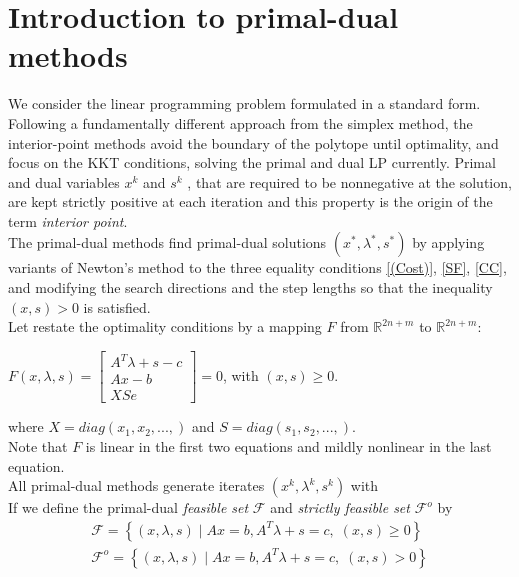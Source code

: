 \documentclass[a4paper,10 pt,titlepage,twoside]{book}
\theoremstyle{plain}
\theoremstyle{definition}
\theoremstyle{remark}
\begin{document}
\newpage
\section{Introduction to primal-dual methods}
We consider the linear programming problem formulated in a standard form. \\
Following a fundamentally different approach from the simplex method, the interior-point methods avoid the boundary of the polytope until optimality, and focus on the KKT conditions, solving the primal and dual LP currently.
Primal and dual variables  $x^{k}$ and $s^{k}$ , that are required to be nonnegative at the solution, are kept strictly positive at each iteration and this property is the origin of the term \textit{interior point}.\\
The primal-dual methods find primal-dual solutions $(x^{*},\lambda^{*},s^{*})$ by applying variants of Newton's method to the three equality conditions \ref{(Cost)}, \ref{SF}, \ref{CC}, and modifying the search directions and the step lengths so that the inequality $(x,s)>0$ is satisfied.\\
 Let restate the optimality conditions by a mapping $\mathit{F}$ from $\mathbb{R}^{2n+m}$ to $\mathbb{R}^{2n+m}$:
\begin{center}\label{F}
	$\mathit{F}(x,\lambda,s)= \begin{bmatrix}
	A^{T}\lambda+s-c \\Ax-b \\XSe
	\end{bmatrix}=0$, with $(x,s)\geq0.$
\end{center}
where $X = diag(x_{1}, x_{2},...,)$ and $S = diag(s_{1}, s_{2},...,)$.\\ Note that $\mathit{F}$ is linear in the first two equations and mildly nonlinear in the last equation. \\ All primal-dual methods generate iterates $(x^{k},\lambda^{k},s^{k})$ with\\
If we define the primal-dual \textit{feasible set} $\mathcal{F}$ and \textit{strictly feasible set} $\mathcal{F}^{o}$ by
\begin{align*}
\mathcal{F} = \left\lbrace(x,\lambda,s)\;|\;Ax = b, A^{T}\lambda+s =c,\;(x,s)\geq0\right\rbrace \\
\mathcal{F}^{o} = \left\lbrace(x,\lambda,s)\;|\;Ax = b, A^{T}\lambda+s =c,\;(x,s)>0\right\rbrace 
\end{align*}
\end{document}
